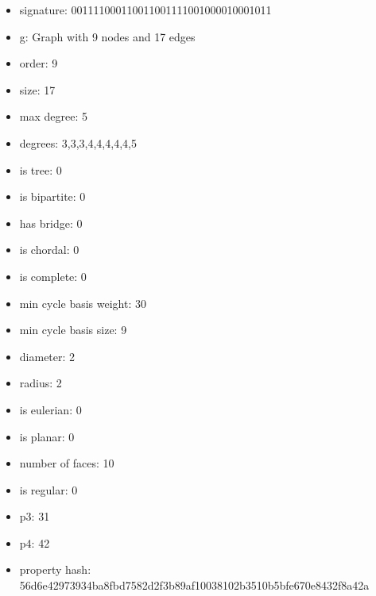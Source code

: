 \newpage
\begin{figure}
\end{figure}
\begin{itemize}
\item signature: 001111000110011001111001000010001011
\item g: Graph with 9 nodes and 17 edges
\item order: 9
\item size: 17
\item max degree: 5
\item degrees: 3,3,3,4,4,4,4,4,5
\item is tree: 0
\item is bipartite: 0
\item has bridge: 0
\item is chordal: 0
\item is complete: 0
\item min cycle basis weight: 30
\item min cycle basis size: 9
\item diameter: 2
\item radius: 2
\item is eulerian: 0
\item is planar: 0
\item number of faces: 10
\item is regular: 0
\item p3: 31
\item p4: 42
\item property hash: 56d6e42973934ba8fbd7582d2f3b89af10038102b3510b5bfe670e8432f8a42a
\end{itemize}

